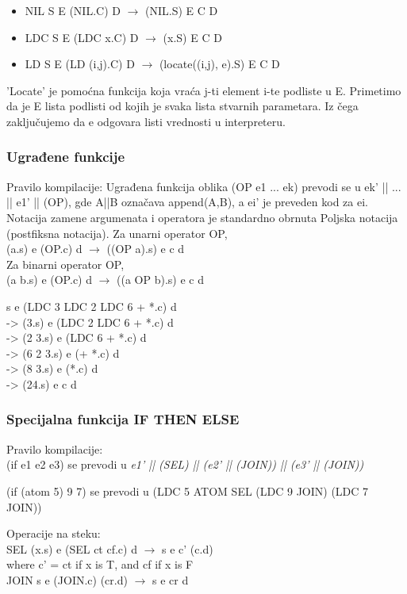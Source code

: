 \begin{primer}
\begin{itemize}
\item NIL S E (NIL.C) D $\rightarrow$ (NIL.S) E C D\\
\item LDC S E (LDC x.C) D $\rightarrow$ (x.S) E C D\\
\item LD S E (LD (i,j).C) D $\rightarrow$ (locate((i,j), e).S) E C D\\
\end{itemize}
\end{primer}
'Locate' je pomoćna funkcija koja vraća j-ti element i-te podliste u E. Primetimo da je E lista podlisti od kojih je svaka lista stvarnih parametara. Iz čega zaključujemo da e odgovara listi vrednosti u interpreteru.

\subsubsection{Ugrađene funkcije}
Pravilo kompilacije: Ugrađena funkcija oblika (OP e1 ... ek) prevodi se u ek' || ... || e1' || (OP), gde A||B označava append(A,B), a ei' je preveden kod za ei. Notacija zamene argumenata i operatora je standardno obrnuta Poljska notacija (postfiksna notacija).
Za unarni operator OP,\\
(a.s) e (OP.c) d $\rightarrow$ ((OP a).s) e c d\\
Za binarni operator OP,\\
(a b.s) e (OP.c) d $\rightarrow$ ((a OP b).s) e c d
\begin{primer}
s e (LDC 3 LDC 2 LDC 6 + *.c) d\\
-> (3.s) e (LDC 2 LDC 6 + *.c) d\\
-> (2 3.s) e (LDC 6 + *.c) d\\
-> (6 2 3.s) e (+ *.c) d\\
-> (8 3.s) e (*.c) d\\
-> (24.s) e c d\\
\end{primer}
\subsubsection{Specijalna funkcija IF THEN ELSE}
Pravilo kompilacije:\\
(if e1 e2 e3) se prevodi u {\em e1' || (SEL) || (e2' || (JOIN)) || (e3' || (JOIN))}\\
\begin{primer}
(if (atom 5) 9 7) se prevodi u (LDC 5 ATOM SEL (LDC 9 JOIN) (LDC 7 JOIN))\\
\end{primer}
Operacije na steku:\\
SEL (x.s) e (SEL ct cf.c) d $\rightarrow$ s e c' (c.d)\\
where c' = ct if x is T, and cf if x is F\\
JOIN s e (JOIN.c) (cr.d) $\rightarrow$ s e cr d\\



